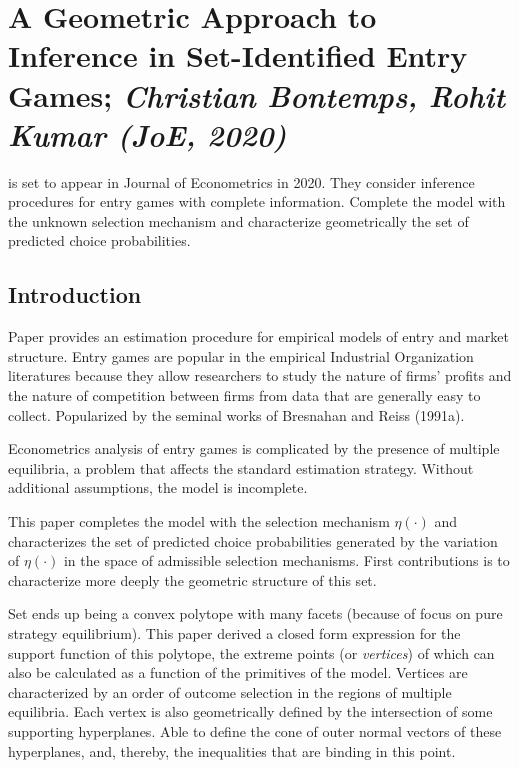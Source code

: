 
\newpage
\section{A Geometric Approach to Inference in Set-Identified Entry Games; \textit{\small Christian Bontemps, Rohit Kumar (JoE, 2020)}}\label{sec:BK-2020}

\citet{BK-2020} is set to appear in Journal of Econometrics in 2020. They consider inference procedures for entry games with complete information. Complete the model with the unknown selection mechanism and characterize geometrically the set of predicted choice probabilities. 

\subsection{Introduction}

Paper provides an estimation procedure for empirical models of entry and market structure. Entry games are popular in the empirical Industrial Organization literatures because they allow researchers to study the nature of firms' profits and the nature of competition between firms from data that are generally easy to collect. Popularized by the seminal works of Bresnahan and Reiss (1991a). 

Econometrics analysis of entry games is complicated by the presence of multiple equilibria, a problem that affects the standard estimation strategy.  Without additional assumptions, the model is incomplete. 

This paper completes the model with the selection mechanism $\eta(\cdot)$ and characterizes the set of predicted choice probabilities generated by the variation of $\eta(\cdot)$ in the space of admissible selection mechanisms. First contributions is to characterize more deeply the geometric structure of this set. 

Set ends up being a convex polytope with many facets (because of focus on pure strategy equilibrium). This paper derived a closed form expression for the support function of this polytope, the extreme points (or \emph{vertices}) of which can also be calculated as a function of the primitives of the model. Vertices are characterized by an order of outcome selection in the regions of multiple equilibria. Each vertex is also geometrically defined by the intersection of some supporting hyperplanes. Able to define the cone of outer normal vectors of these hyperplanes, and, thereby, the inequalities that are binding in this point.

